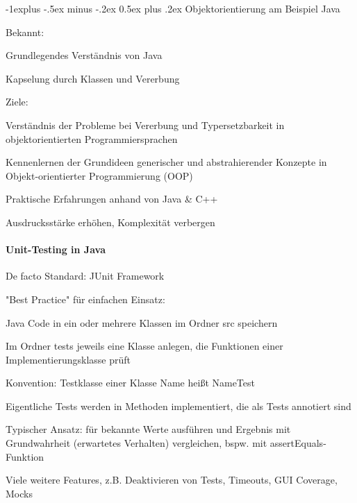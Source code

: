\documentclass[10pt]{article}
\makeatletter
\renewcommand{\subsection}{\@startsection{subsection}{2}{0mm}%
                                {-1explus -.5ex minus -.2ex}%
                                {0.5ex plus .2ex}%
                                {\normalfont\normalsize\bfseries}}
\makeatother
\begin{document}
\begin{itemize*}
\subsection{Objektorientierung am Beispiel Java}
\begin{itemize*}
  \item Bekannt:
  \begin{itemize*}
    \item Grundlegendes Verständnis von Java
    \item Kapselung durch Klassen und Vererbung
  \end{itemize*}
  \item Ziele:
  \begin{itemize*}
    \item Verständnis der Probleme bei Vererbung und Typersetzbarkeit in objektorientierten Programmiersprachen
    \item Kennenlernen der Grundideen generischer und abstrahierender Konzepte in Objekt-orientierter Programmierung (OOP)
    \item Praktische Erfahrungen anhand von Java \& C++
  \end{itemize*}
  \item Ausdrucksstärke erhöhen, Komplexität verbergen
\end{itemize*}

\paragraph{Unit-Testing in Java}
\begin{itemize*}
  \item De facto Standard: JUnit Framework
  \item "Best Practice" für einfachen Einsatz:
  \begin{itemize*}
    \item Java Code in ein oder mehrere Klassen im Ordner src speichern
    \item Im Ordner tests jeweils eine Klasse anlegen, die Funktionen einer Implementierungsklasse prüft
    \item Konvention: Testklasse einer Klasse Name heißt NameTest
    \item Eigentliche Tests werden in Methoden implementiert, die als Tests annotiert sind
    \item Typischer Ansatz: für bekannte Werte ausführen und Ergebnis mit Grundwahrheit (erwartetes Verhalten) vergleichen, bspw. mit assertEquals-Funktion
  \end{itemize*}
  \item Viele weitere Features, z.B. Deaktivieren von Tests, Timeouts, GUI Coverage, Mocks
\end{itemize*}



\end{itemize*}
\end{document}
